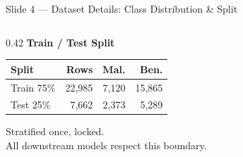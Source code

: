 \documentclass[aspectratio=169, 9pt]{beamer}
\begin{document}
\begin{frame}{Slide 4 --- Dataset Details: Class Distribution \& Split}
\begin{columns}[T]
\begin{column}{0.42\textwidth}
      \vspace{0.5em}
      \textbf{\color{navyblue}Train / Test Split}

      \vspace{0.3em}
      {\small
      \begin{tabular}{@{} l r r r @{}}
        \toprule
        Split & Rows & Mal. & Ben. \\
        \midrule
        Train 75\% & 22,985 & 7,120 & 15,865 \\
        Test  25\% &  7,662 & 2,373 &  5,289 \\
        \bottomrule
      \end{tabular}
      }

      \vspace{0.4em}
      {\scriptsize\color{gray}
      Stratified once, locked.\\ All downstream models respect this boundary.}
    \end{column}

  \end{columns}
\end{frame}
\end{document}
